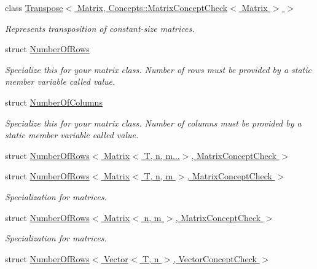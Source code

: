 \begin{DoxyCompactItemize}
class \hyperlink{classFunG_1_1LinearAlgebra_1_1Transpose_3_01Matrix_00_01Concepts_1_1MatrixConceptCheck_3_01Matrix_01_4_01_4}{\-Transpose$<$ Matrix, Concepts\-::\-Matrix\-Concept\-Check$<$ Matrix $>$ $>$}
\begin{DoxyCompactList}\small\item\em \-Represents transposition of constant-\/size matrices. \end{DoxyCompactList}\item 
struct \hyperlink{structFunG_1_1LinearAlgebra_1_1NumberOfRows}{\-Number\-Of\-Rows}
\begin{DoxyCompactList}\small\item\em \-Specialize this for your matrix class. \-Number of rows must be provided by a static member variable called value. \end{DoxyCompactList}\item 
struct \hyperlink{structFunG_1_1LinearAlgebra_1_1NumberOfColumns}{\-Number\-Of\-Columns}
\begin{DoxyCompactList}\small\item\em \-Specialize this for your matrix class. \-Number of columns must be provided by a static member variable called value. \end{DoxyCompactList}\item 
struct \hyperlink{structFunG_1_1LinearAlgebra_1_1NumberOfRows_3_01Matrix_3_01T_00_01n_00_01m_8_8_8_4_00_01MatrixConceptCheck_01_4}{\-Number\-Of\-Rows$<$ Matrix$<$ T, n, m...$>$, Matrix\-Concept\-Check $>$}
\item 
struct \hyperlink{structFunG_1_1LinearAlgebra_1_1NumberOfRows_3_01Matrix_3_01T_00_01n_00_01m_01_4_00_01MatrixConceptCheck_01_4}{\-Number\-Of\-Rows$<$ Matrix$<$ T, n, m $>$, Matrix\-Concept\-Check $>$}
\begin{DoxyCompactList}\small\item\em \-Specialization for matrices. \end{DoxyCompactList}\item 
struct \hyperlink{structFunG_1_1LinearAlgebra_1_1NumberOfRows_3_01Matrix_3_01n_00_01m_01_4_00_01MatrixConceptCheck_01_4}{\-Number\-Of\-Rows$<$ Matrix$<$ n, m $>$, Matrix\-Concept\-Check $>$}
\begin{DoxyCompactList}\small\item\em \-Specialization for matrices. \end{DoxyCompactList}\item 
struct \hyperlink{structFunG_1_1LinearAlgebra_1_1NumberOfRows_3_01Vector_3_01T_00_01n_01_4_00_01VectorConceptCheck_01_4}{\-Number\-Of\-Rows$<$ Vector$<$ T, n $>$, Vector\-Concept\-Check $>$}

\end{DoxyCompactItemize}
